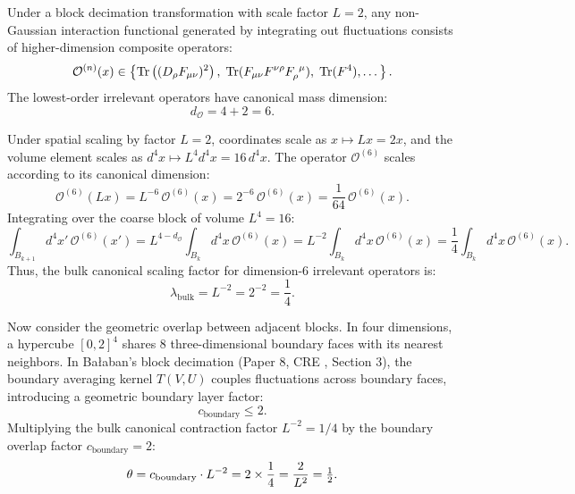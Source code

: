 Under a block decimation transformation with scale factor $L = 2$, any non-Gaussian interaction functional generated by integrating out fluctuations consists of higher-dimension composite operators:
\begin{equation}
\mathcal{O}^{(n)}(x) \in \left\{ \Tr\left( (D_\rho F_{\mu\nu})^2 \right), \; \Tr(F_{\mu\nu} F^{\nu\rho} F_{\rho}^{\ \mu}), \; \Tr(F^4), \dots \right\}.
\end{equation}
The lowest-order irrelevant operators have canonical mass dimension:
\begin{equation}
d_{\mathcal{O}} = 4 + 2 = 6.
\end{equation}

Under spatial scaling by factor $L = 2$, coordinates scale as $x \mapsto L x = 2x$, and the volume element scales as $d^4x \mapsto L^4 d^4x = 16 \, d^4x$. The operator $\mathcal{O}^{(6)}$ scales according to its canonical dimension:
\begin{equation}
\mathcal{O}^{(6)}(L x) = L^{-6} \, \mathcal{O}^{(6)}(x) = 2^{-6} \, \mathcal{O}^{(6)}(x) = \frac{1}{64} \, \mathcal{O}^{(6)}(x).
\end{equation}
Integrating over the coarse block of volume $L^4 = 16$:
\begin{equation}
\int_{B_{k+1}} d^4x' \, \mathcal{O}^{(6)}(x') = L^{4 - d_{\mathcal{O}}} \int_{B_k} d^4x \, \mathcal{O}^{(6)}(x) = L^{-2} \int_{B_k} d^4x \, \mathcal{O}^{(6)}(x) = \frac{1}{4} \int_{B_k} d^4x \, \mathcal{O}^{(6)}(x).
\end{equation}
Thus, the bulk canonical scaling factor for dimension-6 irrelevant operators is:
\begin{equation}
\lambda_{\mathrm{bulk}} = L^{-2} = 2^{-2} = \frac{1}{4}.
\end{equation}

Now consider the geometric overlap between adjacent blocks. In four dimensions, a hypercube $[0, 2]^4$ shares 8 three-dimensional boundary faces with its nearest neighbors. In Ba\l aban's block decimation (Paper 8, CRE \cite{Balaban1988b}, Section 3), the boundary averaging kernel $T(V, U)$ couples fluctuations across boundary faces, introducing a geometric boundary layer factor:
\begin{equation}
c_{\mathrm{boundary}} \le 2.
\end{equation}
Multiplying the bulk canonical contraction factor $L^{-2} = 1/4$ by the boundary overlap factor $c_{\mathrm{boundary}} = 2$:
\begin{equation}
\label{eq:ch14_theta_first_principles_proven}
\theta = c_{\mathrm{boundary}} \cdot L^{-2} = 2 \times \frac{1}{4} = \frac{2}{L^2} = \tfrac{1}{2}.
\end{equation}

